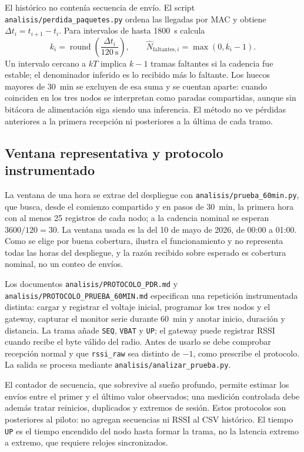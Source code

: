 El histórico no contenía secuencia de envío. El script \texttt{analisis/perdida\_paquetes.py} ordena las llegadas por MAC y obtiene $\Delta t_i=t_{i+1}-t_i$. Para intervalos de hasta 1800~s calcula
\begin{equation}
k_i=\operatorname{round}\!\left(\frac{\Delta t_i}{120~\mathrm{s}}\right),
\qquad
\widehat{N}_{\mathrm{faltantes},i}=\max(0,k_i-1).
\label{eq:metodo-perdida-inferida}
\end{equation}
Un intervalo cercano a $kT$ implica $k-1$ tramas faltantes si la cadencia fue estable; el denominador inferido es lo recibido más lo faltante. Los huecos mayores de 30~min se excluyen de esa suma y se cuentan aparte: cuando coinciden en los tres nodos se interpretan como paradas compartidas, aunque sin bitácora de alimentación siga siendo una inferencia. El método no ve pérdidas anteriores a la primera recepción ni posteriores a la última de cada tramo.

\subsection{Ventana representativa y protocolo instrumentado}
\label{sec:metodo-60min}
La ventana de una hora se extrae del despliegue con \texttt{analisis/prueba\_60min.py}, que busca, desde el comienzo compartido y en pasos de 30~min, la primera hora con al menos 25 registros de cada nodo; a la cadencia nominal se esperan $3600/120=30$. La ventana usada es la del 10 de mayo de 2026, de 00:00 a 01:00. Como se elige por buena cobertura, ilustra el funcionamiento y no representa todas las horas del despliegue, y la razón recibido sobre esperado es cobertura nominal, no un conteo de envíos.

Los documentos \texttt{analisis/PROTOCOLO\_PDR.md} y \texttt{analisis/PROTOCOLO\_PRUEBA\_60MIN.md} especifican una repetición instrumentada distinta: cargar y registrar el voltaje inicial, programar los tres nodos y el gateway, capturar el monitor serie durante 60~min y anotar inicio, duración y distancia. La trama añade \texttt{SEQ}, \texttt{VBAT} y \texttt{UP}; el gateway puede registrar RSSI cuando recibe el byte válido del radio. Antes de usarlo se debe comprobar recepción normal y que \texttt{rssi\_raw} sea distinto de $-1$, como prescribe el protocolo. La salida se procesa mediante \texttt{analisis/analizar\_prueba.py}.

El contador de secuencia, que sobrevive al sueño profundo, permite estimar los envíos entre el primer y el último valor observados; una medición controlada debe además tratar reinicios, duplicados y extremos de sesión. Estos protocolos son posteriores al piloto: no agregan secuencias ni RSSI al CSV histórico. El tiempo \texttt{UP} es el tiempo encendido del nodo hasta formar la trama, no la latencia extremo a extremo, que requiere relojes sincronizados.

